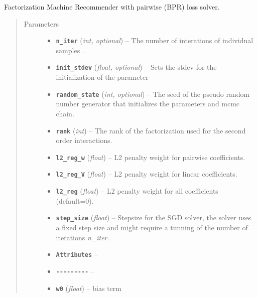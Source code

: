 \documentclass[letterpaper,10pt,english]{sphinxmanual}
\begin{document}
\begin{fulllineitems}
\label{api:fastFM.bpr.FMRecommender}
Factorization Machine Recommender with pairwise (BPR) loss solver.
\begin{quote}\begin{description}
\item[{Parameters}] \leavevmode\begin{itemize}
\item {} 
\textbf{\texttt{n\_iter}} (\emph{int, optional}) -- The number of interations of individual samples .

\item {} 
\textbf{\texttt{init\_stdev}} (\emph{float, optional}) -- Sets the stdev for the initialization of the parameter

\item {} 
\textbf{\texttt{random\_state}} (\emph{int, optional}) -- The seed of the pseudo random number generator that
initializes the parameters and mcmc chain.

\item {} 
\textbf{\texttt{rank}} (\emph{int}) -- The rank of the factorization used for the second order interactions.

\item {} 
\textbf{\texttt{l2\_reg\_w}} (\emph{float}) -- L2 penalty weight for pairwise coefficients.

\item {} 
\textbf{\texttt{l2\_reg\_V}} (\emph{float}) -- L2 penalty weight for linear coefficients.

\item {} 
\textbf{\texttt{l2\_reg}} (\emph{float}) -- L2 penalty weight for all coefficients (default=0).

\item {} 
\textbf{\texttt{step\_size}} (\emph{float}) -- Stepsize for the SGD solver, the solver uses a fixed step size and
might require a tunning of the number of iterations \emph{n\_iter}.

\item {} 
\textbf{\texttt{Attributes}} -- 

\item {} 
\textbf{\texttt{-{-}-{-}-{-}-{-}-}} -- 

\item {} 
\textbf{\texttt{w0}} (\emph{float}) -- bias term


\end{itemize}
\end{description}
\end{quote}
\end{fulllineitems}
\end{document}
